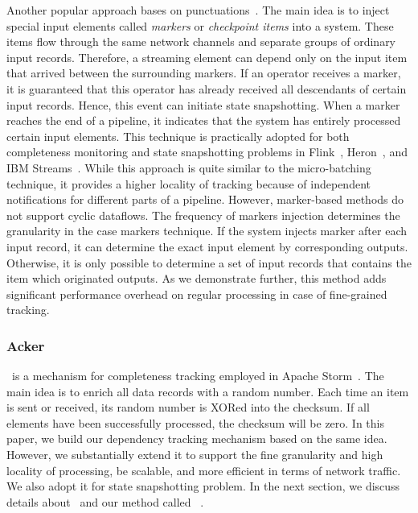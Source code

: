 Another popular approach bases on punctuations~\cite{Tucker:2003:EPS:776752.776780}. The main idea is to inject special input elements called {\em markers} or {\em checkpoint items} into a system. These items flow through the same network channels and separate groups of ordinary input records. Therefore, a streaming element can depend only on the input item that arrived between the surrounding markers. If an operator receives a marker, it is guaranteed that this operator has already received all descendants of certain input records. Hence, this event can initiate state snapshotting. When a marker reaches the end of a pipeline, it indicates that the system has entirely processed certain input elements. This technique is practically adopted for both completeness monitoring and state snapshotting problems in Flink~\cite{Carbone:2017:SMA:3137765.3137777}, Heron~\cite{Kulkarni:2015:THS:2723372.2742788}, and IBM Streams~\cite{jacques2016consistent}. While this approach is quite similar to the micro-batching technique, it provides a higher locality of tracking because of independent notifications for different parts of a pipeline. However, marker-based methods do not support cyclic dataflows. The frequency of markers injection determines the granularity in the case markers technique. If the system injects marker after each input record, it can determine the exact input element by corresponding outputs. Otherwise, it is only possible to determine a set of input records that contains the item which originated outputs. As we demonstrate further, this method adds significant performance overhead on regular processing in case of fine-grained tracking.

\subsubsection{Acker}

\acker\ is a mechanism for completeness tracking employed in Apache Storm~\cite{apache:storm}. The main idea is to enrich all data records with a random number. Each time an item is sent or received, its random number is XORed into the checksum. If all elements have been successfully processed, the checksum will be zero. In this paper, we build our dependency tracking mechanism based on the same idea. However, we substantially extend it to support the fine granularity and high locality of processing, be scalable, and more efficient in terms of network traffic. We also adopt it for state snapshotting problem. In the next section, we discuss details about \acker\ and our method called \tracker\ .
